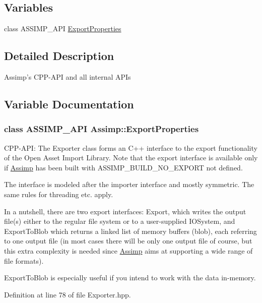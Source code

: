 \subsection*{Variables}
\begin{CompactItemize}
\item 
class ASSIMP\_\-API \hyperlink{namespace_assimp_81d358b0d2907db3ffe185d60f41aa83}{ExportProperties}
\end{CompactItemize}


\subsection{Detailed Description}
Assimp's CPP-API and all internal APIs 

\subsection{Variable Documentation}
\hypertarget{namespace_assimp_81d358b0d2907db3ffe185d60f41aa83}{
\subsubsection[ExportProperties]{\setlength{\rightskip}{0pt plus 5cm}class ASSIMP\_\-API {\bf Assimp::ExportProperties}}}
\label{namespace_assimp_81d358b0d2907db3ffe185d60f41aa83}


CPP-API: The Exporter class forms an C++ interface to the export functionality of the Open Asset Import Library. Note that the export interface is available only if \hyperlink{namespace_assimp}{Assimp} has been built with ASSIMP\_\-BUILD\_\-NO\_\-EXPORT not defined.

The interface is modeled after the importer interface and mostly symmetric. The same rules for threading etc. apply.

In a nutshell, there are two export interfaces: Export, which writes the output file(s) either to the regular file system or to a user-supplied IOSystem, and ExportToBlob which returns a linked list of memory buffers (blob), each referring to one output file (in most cases there will be only one output file of course, but this extra complexity is needed since \hyperlink{namespace_assimp}{Assimp} aims at supporting a wide range of file formats).

ExportToBlob is especially useful if you intend to work with the data in-memory. 

Definition at line 78 of file Exporter.hpp.